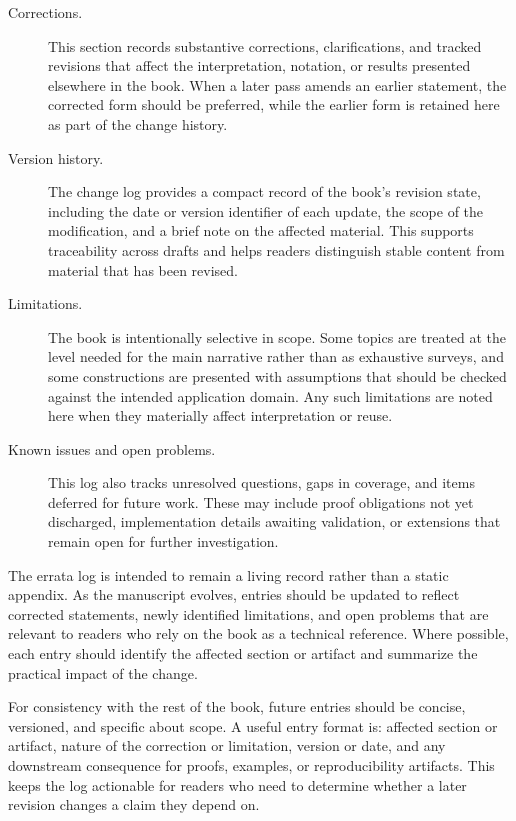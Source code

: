 \begin{description}
  \item[Corrections.] This section records substantive corrections, clarifications, and tracked revisions that affect the interpretation, notation, or results presented elsewhere in the book. When a later pass amends an earlier statement, the corrected form should be preferred, while the earlier form is retained here as part of the change history.

  \item[Version history.] The change log provides a compact record of the book's revision state, including the date or version identifier of each update, the scope of the modification, and a brief note on the affected material. This supports traceability across drafts and helps readers distinguish stable content from material that has been revised.

  \item[Limitations.] The book is intentionally selective in scope. Some topics are treated at the level needed for the main narrative rather than as exhaustive surveys, and some constructions are presented with assumptions that should be checked against the intended application domain. Any such limitations are noted here when they materially affect interpretation or reuse.

  \item[Known issues and open problems.] This log also tracks unresolved questions, gaps in coverage, and items deferred for future work. These may include proof obligations not yet discharged, implementation details awaiting validation, or extensions that remain open for further investigation.
\end{description}

The errata log is intended to remain a living record rather than a static appendix. As the manuscript evolves, entries should be updated to reflect corrected statements, newly identified limitations, and open problems that are relevant to readers who rely on the book as a technical reference. Where possible, each entry should identify the affected section or artifact and summarize the practical impact of the change.

For consistency with the rest of the book, future entries should be concise, versioned, and specific about scope. A useful entry format is: affected section or artifact, nature of the correction or limitation, version or date, and any downstream consequence for proofs, examples, or reproducibility artifacts. This keeps the log actionable for readers who need to determine whether a later revision changes a claim they depend on.

